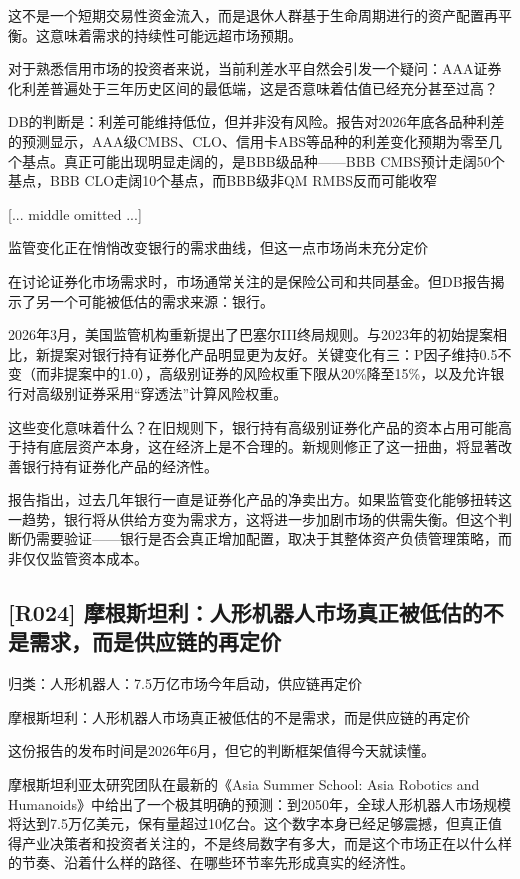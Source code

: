 \documentclass[11pt]{ctexart}
\begin{document}
这不是一个短期交易性资金流入，而是退休人群基于生命周期进行的资产配置再平衡。这意味着需求的持续性可能远超市场预期。

对于熟悉信用市场的投资者来说，当前利差水平自然会引发一个疑问：AAA证券化利差普遍处于三年历史区间的最低端，这是否意味着估值已经充分甚至过高？

DB的判断是：利差可能维持低位，但并非没有风险。报告对2026年底各品种利差的预测显示，AAA级CMBS、CLO、信用卡ABS等品种的利差变化预期为零至几个基点。真正可能出现明显走阔的，是BBB级品种——BBB CMBS预计走阔50个基点，BBB CLO走阔10个基点，而BBB级非QM RMBS反而可能收窄

[... middle omitted ...]

 监管变化正在悄悄改变银行的需求曲线，但这一点市场尚未充分定价

在讨论证券化市场需求时，市场通常关注的是保险公司和共同基金。但DB报告揭示了另一个可能被低估的需求来源：银行。

2026年3月，美国监管机构重新提出了巴塞尔III终局规则。与2023年的初始提案相比，新提案对银行持有证券化产品明显更为友好。关键变化有三：P因子维持0.5不变（而非提案中的1.0），高级别证券的风险权重下限从20\%降至15\%，以及允许银行对高级别证券采用“穿透法”计算风险权重。

这些变化意味着什么？在旧规则下，银行持有高级别证券化产品的资本占用可能高于持有底层资产本身，这在经济上是不合理的。新规则修正了这一扭曲，将显著改善银行持有证券化产品的经济性。

报告指出，过去几年银行一直是证券化产品的净卖出方。如果监管变化能够扭转这一趋势，银行将从供给方变为需求方，这将进一步加剧市场的供需失衡。但这个判断仍需要验证——银行是否会真正增加配置，取决于其整体资产负债管理策略，而非仅仅监管资本成本。

\subsection{[R024] 摩根斯坦利：人形机器人市场真正被低估的不是需求，而是供应链的再定价}
{\small\color{refgray}归类：人形机器人：7.5万亿市场今年启动，供应链再定价}

摩根斯坦利：人形机器人市场真正被低估的不是需求，而是供应链的再定价

这份报告的发布时间是2026年6月，但它的判断框架值得今天就读懂。

摩根斯坦利亚太研究团队在最新的《Asia Summer School: Asia Robotics and Humanoids》中给出了一个极其明确的预测：到2050年，全球人形机器人市场规模将达到7.5万亿美元，保有量超过10亿台。这个数字本身已经足够震撼，但真正值得产业决策者和投资者关注的，不是终局数字有多大，而是这个市场正在以什么样的节奏、沿着什么样的路径、在哪些环节率先形成真实的经济性。
\end{document}
